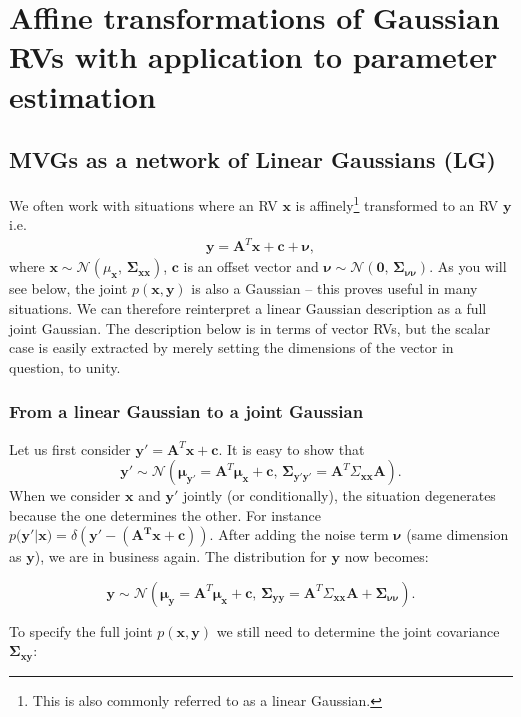 \chapter{Affine transformations of Gaussian RVs with application to parameter estimation}


\section{MVGs as a network of Linear Gaussians (LG)}

We often work with situations where an RV $\bm{x}$ is
affinely\footnote{This is also commonly referred to as a linear
Gaussian.}  transformed to an RV $\bm{y}$ i.e.
\begin{align*}
  \bm{y}=\bm{A}^{T}\bm{x}+\bm{c}+\bm{\nu},
\end{align*}
where
$\bm{x}\sim\mathcal{N}(\mu_{\bm{x}},\bm{\,\Sigma}_{\bm{xx}})$,
$\bm{c}$ is an offset vector and
$\bm{\nu}\sim\mathcal{N}(\bm{0},\,\bm{\Sigma}_{\bm{\nu\nu}})$.  As you
will see below, the joint $p(\bm{x},\bm{y})$ is also a Gaussian --
this proves useful in many situations. We can therefore reinterpret a
linear Gaussian description as a full joint Gaussian. The description
below is in terms of vector RVs, but the scalar case is easily
extracted by merely setting the dimensions of the vector in question,
to unity.

\subsection{From a linear Gaussian to a joint Gaussian}

Let us first consider $\bm{y}'=\bm{A}^{T}\bm{x}+\bm{c}$.
It is easy to show that
\[
\bm{y}'\sim\mathcal{N}(\bm{\mu_{\bm{y}'}=}\bm{A}^{T}\bm{\mu_{\bm{x}}}+\bm{c},\,\bm{\Sigma}_{\bm{y'y'}}=\bm{A}^{T}\Sigma_{\bm{xx}}\bm{A}).
\]
When we consider $\bm{x}$ and $\bm{y}'$ jointly (or conditionally),
the situation degenerates because the one determines the other. For
instance
$p(\bm{y'|}\bm{x)}=\delta(\bm{y'}-(\bm{A^{T}}\bm{x}+\bm{c}))$.  After
adding the noise term $\bm{\nu}$ (same dimension as $\bm{y}$), we are
in business again. The distribution for $\bm{y}$
now becomes:

\[
\bm{y}\sim\mathcal{N}(\bm{\mu_{\bm{y}}=}\bm{A}^{T}\bm{\mu_{\bm{x}}}+\bm{c},\,\bm{\Sigma}_{\bm{yy}}=\bm{A}^{T}\Sigma_{\bm{xx}}\bm{A}+\bm{\Sigma}_{\bm{\nu\nu}}).
\]


To specify the full joint $p(\bm{x},\bm{y})$ we still need
to determine the joint covariance $\bm{\Sigma}_{\bm{xy}}$:

